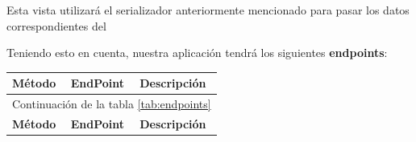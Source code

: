 \begin{itemize}
        Esta vista utilizará el
        serializador anteriormente mencionado para pasar los datos correspondientes del 
    \end{itemize}

Teniendo esto en cuenta, nuestra aplicación tendrá los siguientes \textbf{endpoints}:

\begin{longtable}[H]{|l|l|l|}
    \hline
    \textbf{Método} & \textbf{EndPoint} & \textbf{Descripción} \\
    \hline
    \endfirsthead
   
    \hline
    \multicolumn{3}{|c|}{Continuación de la tabla \ref{tab:endpoints}}\\
    \hline
    \textbf{Método} & \textbf{EndPoint} & \textbf{Descripción} \\
    \hline
    \hline
    \endhead
   

\end{longtable}

